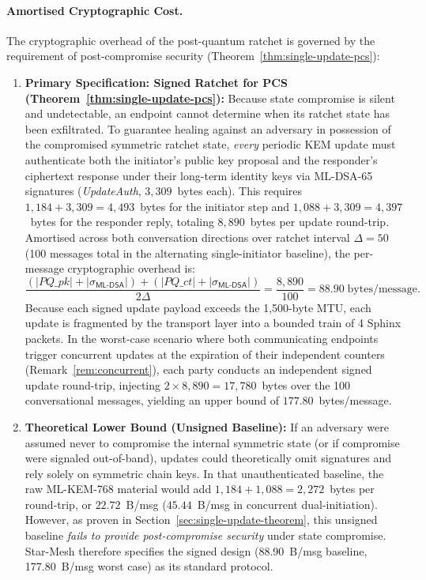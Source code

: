 \documentclass[11pt,a4paper]{article}
\theoremstyle{remark}
\theoremstyle{plain}
\newcommand{\MLDSA}{\mathsf{ML\text{-}DSA}}
\begin{document}
\paragraph{Amortised Cryptographic Cost.}
The cryptographic overhead of the post-quantum ratchet is governed by the requirement of post-compromise security (Theorem~\ref{thm:single-update-pcs}):
\begin{enumerate}
  \item \textbf{Primary Specification: Signed Ratchet for PCS (Theorem~\ref{thm:single-update-pcs}):} Because state compromise is silent and undetectable, an endpoint cannot determine when its ratchet state has been exfiltrated.  To guarantee healing against an adversary in possession of the compromised symmetric ratchet state, \emph{every} periodic KEM update must authenticate both the initiator's public key proposal and the responder's ciphertext response under their long-term identity keys via ML-DSA-65 signatures (\emph{UpdateAuth}, $3{,}309$~bytes each).  This requires $1{,}184 + 3{,}309 = 4{,}493$~bytes for the initiator step and $1{,}088 + 3{,}309 = 4{,}397$~bytes for the responder reply, totaling $8{,}890$~bytes per update round-trip.  Amortised across both conversation directions over ratchet interval $\Delta = 50$ (100 messages total in the alternating single-initiator baseline), the per-message cryptographic overhead is:
        \[
          \frac{(|PQ\_pk| + |\sigma_{\MLDSA}|) + (|PQ\_ct| + |\sigma_{\MLDSA}|)}{2\Delta}
          = \frac{8{,}890}{100}
          = 88.90 \;\text{bytes/message.}
        \]
        Because each signed update payload exceeds the 1{,}500-byte MTU, each update is fragmented by the transport layer into a bounded train of 4 Sphinx packets.
        In the worst-case scenario where both communicating endpoints trigger concurrent updates at the expiration of their independent counters (Remark~\ref{rem:concurrent}), each party conducts an independent signed update round-trip, injecting $2 \times 8{,}890 = 17{,}780$~bytes over the 100 conversational messages, yielding an upper bound of $177.80$~bytes/message.
  \item \textbf{Theoretical Lower Bound (Unsigned Baseline):} If an adversary were assumed never to compromise the internal symmetric state (or if compromise were signaled out-of-band), updates could theoretically omit signatures and rely solely on symmetric chain keys.  In that unauthenticated baseline, the raw ML-KEM-768 material would add $1{,}184 + 1{,}088 = 2{,}272$~bytes per round-trip, or $22.72$~B/msg ($45.44$~B/msg in concurrent dual-initiation).  However, as proven in Section~\ref{sec:single-update-theorem}, this unsigned baseline \emph{fails to provide post-compromise security} under state compromise.  Star-Mesh therefore specifies the signed design (88.90~B/msg baseline, 177.80~B/msg worst case) as its standard protocol.
\end{enumerate}
\end{document}
